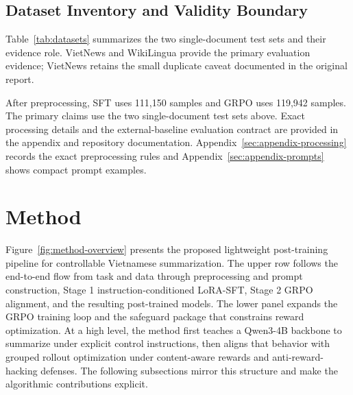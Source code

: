 \documentclass[11pt]{article}
\begin{document}
\subsection{Dataset Inventory and Validity Boundary}
Table~\ref{tab:datasets} summarizes the two single-document test sets and their evidence role. VietNews and WikiLingua provide the primary evaluation evidence; VietNews retains the small duplicate caveat documented in the original report.

\begin{table}[t]
\centering
\caption{Single-document evaluation suite and validity boundary used in the original project evaluation.}
\label{tab:datasets}
\footnotesize
{}
\end{table}

After preprocessing, SFT uses 111,150 samples and GRPO uses 119,942 samples. The primary claims use the two single-document test sets above. Exact processing details and the external-baseline evaluation contract are provided in the appendix and repository documentation.
Appendix~\ref{sec:appendix-processing} records the exact preprocessing rules and Appendix~\ref{sec:appendix-prompts} shows compact prompt examples.

\section{Method}


Figure~\ref{fig:method-overview} presents the proposed lightweight
post-training pipeline for controllable Vietnamese summarization.
The upper row follows the end-to-end flow from task and data through
preprocessing and prompt construction, Stage 1 instruction-conditioned
LoRA-SFT, Stage 2 GRPO alignment, and the resulting post-trained models.
The lower panel expands the GRPO training loop and the safeguard package that
constrains reward optimization. At a high level, the method first teaches a
Qwen3-4B backbone to summarize under explicit control instructions, then
aligns that behavior with grouped rollout optimization under content-aware
rewards and anti-reward-hacking defenses. The following subsections mirror
this structure and make the algorithmic contributions explicit.
\end{document}
